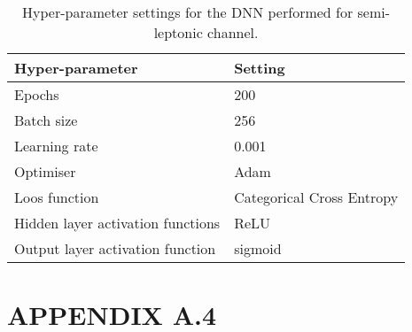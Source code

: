 \begin{table}[h!]
    \centering
    \caption{Hyper-parameter settings for the DNN performed for semi-leptonic channel.}
    \begin{tabular}{ l l }
    \hline
    Hyper-parameter & Setting \\
    \hline
    Epochs & 200 \\
    Batch size & 256 \\
    Learning rate & 0.001 \\
    Optimiser & Adam \\
    Loos function & Categorical Cross Entropy \\
    Hidden layer activation functions & ReLU \\
    Output layer activation function & sigmoid \\
    \hline
    \end{tabular}
    \label{hasOneL_dnnpars}
\end{table}
\newpage


\section*{APPENDIX A.4}\label{App4}

